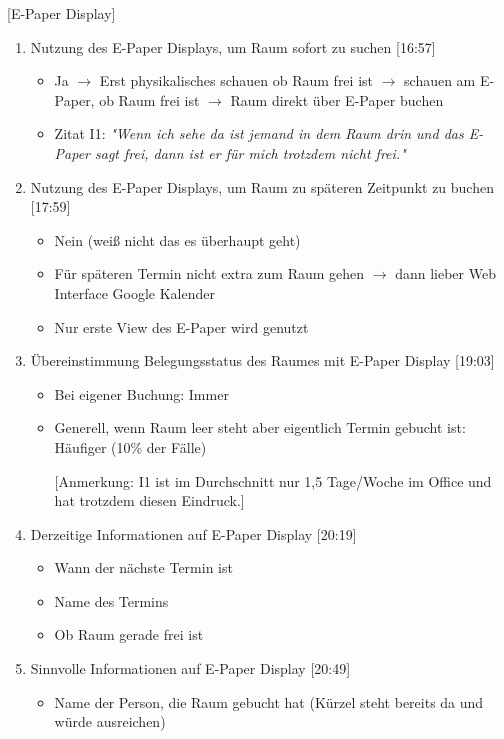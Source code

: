 [E-Paper Display]

\begin{enumerate}

    \item Nutzung des E-Paper Displays, um Raum sofort zu suchen [16:57]
    \begin{itemize}
        \item Ja $\rightarrow$ Erst physikalisches schauen ob Raum frei ist $\rightarrow$ schauen am E-Paper, ob Raum frei ist $\rightarrow$ Raum direkt über E-Paper buchen
        \item Zitat I1: \textit{"Wenn ich sehe da ist jemand in dem Raum drin und das E-Paper sagt frei, dann ist er für mich trotzdem nicht frei."}
    \end{itemize}

    \item Nutzung des E-Paper Displays, um Raum zu späteren Zeitpunkt zu buchen [17:59]
     \begin{itemize}
        \item Nein (weiß nicht das es überhaupt geht)
        \item Für späteren Termin nicht extra zum Raum gehen $\rightarrow$ dann lieber Web Interface Google Kalender
        \item Nur erste View des E-Paper wird genutzt
    \end{itemize}

    \item Übereinstimmung Belegungsstatus des Raumes mit E-Paper Display [19:03]
     \begin{itemize}
        \item Bei eigener Buchung: Immer
        \item Generell, wenn Raum leer steht aber eigentlich Termin gebucht ist: Häufiger (10\% der Fälle)
        \item[] [Anmerkung: I1 ist im Durchschnitt nur 1,5 Tage/Woche im Office und hat trotzdem diesen Eindruck.]
    \end{itemize}

    \item Derzeitige Informationen auf E-Paper Display [20:19]
     \begin{itemize}
        \item Wann der nächste Termin ist
        \item Name des Termins
        \item Ob Raum gerade frei ist
    \end{itemize}

    \item Sinnvolle Informationen auf E-Paper Display [20:49]
     \begin{itemize}
        \item Name der Person, die Raum gebucht hat (Kürzel steht bereits da und würde ausreichen)
    \end{itemize}
    
\end{enumerate}

